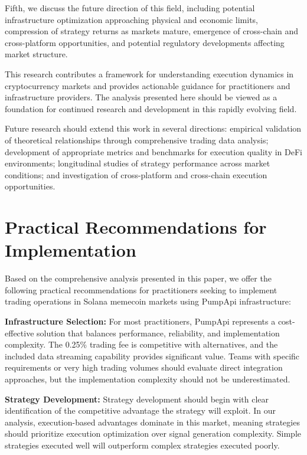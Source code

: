 \documentclass[12pt,a4paper]{article}
\begin{document}
Fifth, we discuss the future direction of this field, including potential infrastructure optimization approaching physical and economic limits, compression of strategy returns as markets mature, emergence of cross-chain and cross-platform opportunities, and potential regulatory developments affecting market structure.

This research contributes a framework for understanding execution dynamics in cryptocurrency markets and provides actionable guidance for practitioners and infrastructure providers. The analysis presented here should be viewed as a foundation for continued research and development in this rapidly evolving field.

Future research should extend this work in several directions: empirical validation of theoretical relationships through comprehensive trading data analysis; development of appropriate metrics and benchmarks for execution quality in DeFi environments; longitudinal studies of strategy performance across market conditions; and investigation of cross-platform and cross-chain execution opportunities.

\section{Practical Recommendations for Implementation}

Based on the comprehensive analysis presented in this paper, we offer the following practical recommendations for practitioners seeking to implement trading operations in Solana memecoin markets using PumpApi infrastructure:

\textbf{Infrastructure Selection:} For most practitioners, PumpApi represents a cost-effective solution that balances performance, reliability, and implementation complexity. The 0.25\% trading fee is competitive with alternatives, and the included data streaming capability provides significant value. Teams with specific requirements or very high trading volumes should evaluate direct integration approaches, but the implementation complexity should not be underestimated.

\textbf{Strategy Development:} Strategy development should begin with clear identification of the competitive advantage the strategy will exploit. In our analysis, execution-based advantages dominate in this market, meaning strategies should prioritize execution optimization over signal generation complexity. Simple strategies executed well will outperform complex strategies executed poorly.
\end{document}
